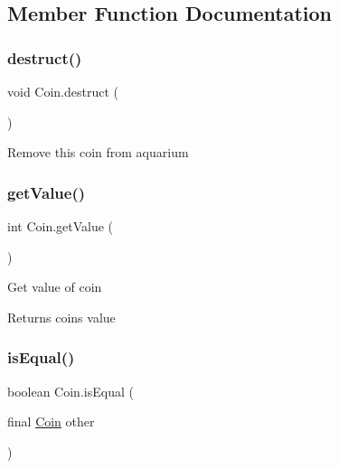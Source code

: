 \subsection{Member Function Documentation}
\mbox{\label{class_coin_ad0f8b3b672fbbd7c48887ad9329b9278}} 
\subsubsection{\texorpdfstring{destruct()}{destruct()}}
{\footnotesize\ttfamily void Coin.\+destruct (\begin{DoxyParamCaption}{ }\end{DoxyParamCaption})\hspace{0.3cm}{\ttfamily [inline]}}

Remove this coin from aquarium \mbox{\label{class_coin_a88f92924fc56857a1f84c44f4bda93d7}} 
\subsubsection{\texorpdfstring{get\+Value()}{getValue()}}
{\footnotesize\ttfamily int Coin.\+get\+Value (\begin{DoxyParamCaption}{ }\end{DoxyParamCaption})\hspace{0.3cm}{\ttfamily [inline]}}

Get value of coin \begin{DoxyReturn}{Returns}
coin\textquotesingle{}s value 
\end{DoxyReturn}
\mbox{\label{class_coin_a8e63f79b5aeba19747c9ef55f4c92f41}} 
\subsubsection{\texorpdfstring{is\+Equal()}{isEqual()}}
{\footnotesize\ttfamily boolean Coin.\+is\+Equal (\begin{DoxyParamCaption}\item[{final \mbox{\hyperlink{class_coin}{Coin}}}]{other }\end{DoxyParamCaption})\hspace{0.3cm}{\ttfamily [inline]}}

